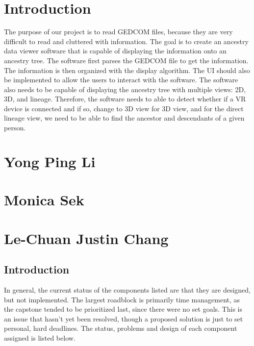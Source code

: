 \documentclass[onecolumn, draftclsnofoot, 10pt, compsoc]{IEEEtran}
\begin{document}
\section{Introduction }
\begin{singlespace}
The purpose of our project is to read GEDCOM files, because they are very difficult to read and cluttered with information. The goal is to create an ancestry data viewer software that is capable of displaying the information onto an ancestry tree. The software first parses the GEDCOM file to get the information. The information is then organized with the display algorithm. The UI should also be implemented to allow the users to interact with the software. The software also needs to be capable of displaying the ancestry tree with multiple views: 2D, 3D, and lineage. Therefore, the software needs to able to detect whether if a VR device is connected and if so, change to 3D view for 3D view, and for the direct lineage view, we need to be able to find the ancestor and descendants of a given person.
\end{singlespace}

\section{Yong Ping Li}
\section{Monica Sek}
\section{Le-Chuan Justin Chang}
\subsection{Introduction}
\begin{singlespace}
In general, the current status of the components listed are that they are designed, but not implemented. The largest roadblock is primarily time management, as the capstone tended to be prioritized last, since there were no set goals. This is an issue that hasn't yet been resolved, though a proposed solution is just to set personal, hard deadlines. The status, problems and design of each component assigned is listed below.
\end{singlespace}
\end{document}
